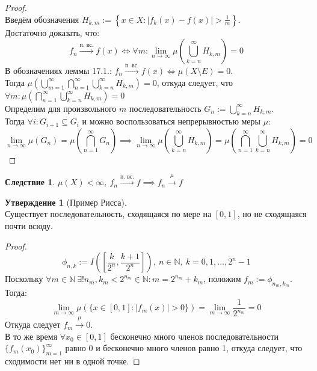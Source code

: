 \documentclass[11pt,a4paper]{report}
\def\Natural{\mathbb{N}}
\theoremstyle{definition}
\theoremstyle{definition}
\newtheorem{preposition}{Утверждение}[section]
\newtheorem{corollary}{Следствие}[section]
\theoremstyle{definition}
\begin{document}
		\begin{proof}$  $\\
			Введём обозначения $ H_{k, m} := \left \{x \in X: |f_{k}(x) - f(x)| > \frac{1}{m} \right \} $.\\
			Достаточно доказать, что:
			\[ 
				f_{n} \xrightarrow{\text{п. вс.}} f(x) \iff \forall m: \lim\limits_{n\to\infty}\mu\left( \bigcup\limits_{k=n}^{\infty} H_{k, m} \right) = 0
			\]
			В обозначениях леммы 17.1.: $ f_{n} \xrightarrow{\text{п. вс.}} f(x) \iff \mu(X \setminus E) = 0  $.\\ 
			Тогда
			$
				\mu\left(\bigcup\limits_{m=1}^{\infty}\bigcap\limits_{n=1}^{\infty} \bigcup\limits_{k=n}^{\infty} H_{k, m} \right) = 0 $, откуда следует, что $ \forall m:  \mu\left(\bigcap\limits_{n=1}^{\infty} \bigcup\limits_{k=n}^{\infty} H_{k, m} \right) = 0
			$\\
			Определим для произвольного $ m $ последовательность $ G_{n} := \bigcup\limits_{k=n}^{\infty}H_{k, m} $.\\
			Тогда $ \forall i: G_{i+1} \subseteq G_{i} $ и можно воспользоваться непрерывностью меры $ \mu $:\\
			\[
				\lim\limits_{n\to\infty}\mu(G_{n}) = \mu\left( \bigcap\limits_{n=1}^{\infty}G_{n} \right) \implies \lim\limits_{n\to\infty}\mu\left( \bigcup\limits_{k=n}^{\infty} H_{k, m} \right) = \mu\left(\bigcap\limits_{n=1}^{\infty} \bigcup\limits_{k=n}^{\infty} H_{k, m} \right) = 0
			\]
		\end{proof}
		\begin{corollary}
			$ \mu(X) < \infty,\ f_{n} \xrightarrow{\text{п. вс.}} f \implies f_{n} \xrightarrow{\mu} f $
		\end{corollary}
		\begin{preposition}[Пример Рисса]$  $\\
			Существует последовательность, сходящаяся по мере на $ [0, 1] $, но не сходящаяся почти всюду.
		\end{preposition}
		\begin{proof}
			\[ \phi_{n, k} := I\left (\left[ \frac{k}{2^{n}}, \frac{k+1}{2^{n}} \right]\right ),\ n \in \Natural,\ k = 0, 1, \dots, 2^{n}-1 \]
			Поскольку $ \forall m \in \Natural\ \exists! n_{m}, k_{m} < 2^{n_{m}} \in \Natural: m = 2^{n_{m}} + k_{m} $, положим $ f_{m} := \phi_{n_{m}, k_{m}} $.\\
			Тогда:
			\[ \lim\limits_{m\to\infty}\mu(\{ x \in [0, 1]: |f_{m}(x)| > 0 \}) = \lim\limits_{m\to\infty}\frac{1}{2^{n_{m}}} = 0 \]
			Откуда следует $ f_{m} \xrightarrow{\mu} 0 $.\\
			В то же время $ \forall x_{0} \in [0, 1] $ бесконечно много членов последовательности $ \{f_{m}(x_{0})\}_{m=1}^{\infty} $ равно 0 и бесконечно много членов равно 1, откуда следует, что сходимости нет ни в одной точке.
		\end{proof}
\end{document}
